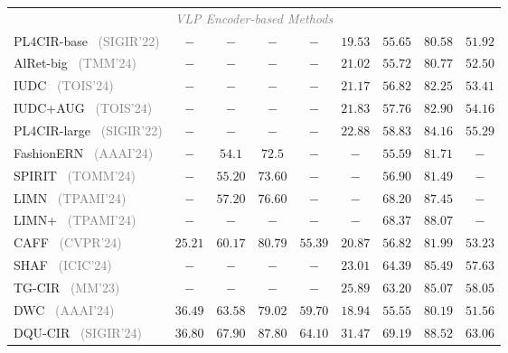 \begin{table*}
\begin{tabular}{l|ccc|c|ccc|c}
    \multicolumn{9}{c}{\textit{\textcolor{gray}{VLP Encoder-based Methods}}} \\
    PL4CIR-base~\cite{zhao2022PL4CIR} \footnotesize{\textcolor{gray}{(SIGIR'22)}} &$-$ &$-$ & $-$&$-$& $19.53$ & {$55.65$} & {$80.58$} & $51.92$ \\
    AlRet-big~\cite{xu2024alret} \footnotesize{\textcolor{gray}{(TMM'24)}} &$-$ &$-$ & $-$&$-$& $21.02$ & $55.72$ & $80.77$ & $52.50$ \\
    IUDC~\cite{ge2024iudc} \footnotesize{\textcolor{gray}{(TOIS'24)}} &$-$ &$-$ & $-$&$-$& $21.17$ & $56.82$ & $82.25$ & $53.41$ \\
    IUDC+AUG~\cite{ge2024iudc} \footnotesize{\textcolor{gray}{(TOIS'24)}} &$-$ &$-$ & $-$&$-$& $21.83$ & $57.76$ & $82.90$ & $54.16$ \\
    PL4CIR-large~\cite{zhao2022PL4CIR} \footnotesize{\textcolor{gray}{(SIGIR'22)}} &$-$ &$-$ & $-$&$-$& $22.88$ & $58.83$ & $84.16$ & $55.29$ \\
    FashionERN~\cite{chen2024fashionern} \footnotesize{\textcolor{gray}{(AAAI'24)}} & $-$ & {$54.1 $} & {$72.5 $} & $-$ & $-$ & $55.59$ & $81.71$ & $-$ \\
    SPIRIT~\cite{chen2024spirit} \footnotesize{\textcolor{gray}{(TOMM'24)}} & $-$ & {$55.20$} & {$73.60$} & $-$ & $-$ & $56.90$ & $81.49$ & $-$ \\
    LIMN~\cite{wen2023limn} \footnotesize{\textcolor{gray}{(TPAMI'24)}} & $-$ & {$57.20$} & {$76.60$} & $-$ & $-$ & $68.20$ & $87.45$ & $-$ \\
    LIMN+~\cite{wen2023limn} \footnotesize{\textcolor{gray}{(TPAMI'24)}} &$-$ &$-$ & $-$&$-$& $-$ & $68.37$ & $88.07$ & $-$ \\
    CAFF~\cite{wan2024caff} \footnotesize{\textcolor{gray}{(CVPR'24)}} & {$25.21$} & {$60.17$} & {$80.79$} & {$55.39$} & $20.87$ & $56.82$ & $81.99$ & $53.23$ \\
    SHAF~\cite{yan2024shaf} \footnotesize{\textcolor{gray}{(ICIC'24)}} &$-$ &$-$ & $-$&$-$& $23.01$ & $64.39$ & $85.49$ & $57.63$ \\
    TG-CIR~\cite{wen2023tgcir} \footnotesize{\textcolor{gray}{(MM'23)}} &$-$ &$-$ & $-$&$-$& $25.89$ & $63.20$ & $85.07$ & $58.05$ \\
    DWC~\cite{huang2024dwc} \footnotesize{\textcolor{gray}{(AAAI'24)}} & {$36.49$} & {$63.58$} & {$79.02$} & {$59.70$} &$18.94$ &$55.55$ & $80.19$ & $51.56$\\
    DQU-CIR~\cite{wen2024dqu} \footnotesize{\textcolor{gray}{(SIGIR'24)}} & {$36.80$} & {$67.90$} & {$87.80$} & {$64.10$} &$31.47$ &$69.19$ & $88.52$&$63.06$\\
    
    \hline
    \end{tabular}
    \label{tab:supervised_CIR_exp_fashion200k_shoes_css}
\end{table*}


